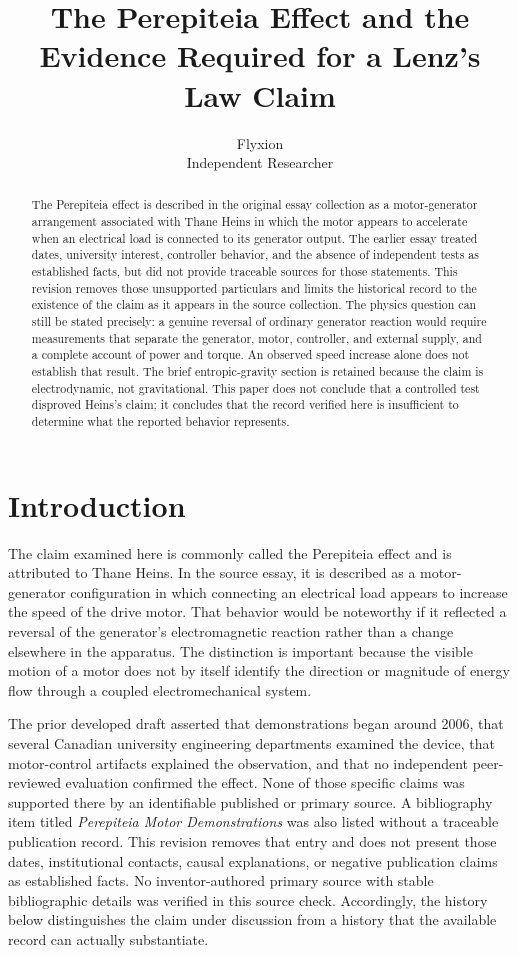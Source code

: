 \documentclass[11pt]{article}
\title{The Perepiteia Effect and the Evidence Required for a Lenz's Law Claim}
\author{Flyxion \\ \small Independent Researcher}
\date{}
\begin{document}
\maketitle

\begin{abstract}
The Perepiteia effect is described in the original essay collection as a motor-generator arrangement associated with Thane Heins in which the motor appears to accelerate when an electrical load is connected to its generator output. The earlier essay treated dates, university interest, controller behavior, and the absence of independent tests as established facts, but did not provide traceable sources for those statements. This revision removes those unsupported particulars and limits the historical record to the existence of the claim as it appears in the source collection. The physics question can still be stated precisely: a genuine reversal of ordinary generator reaction would require measurements that separate the generator, motor, controller, and external supply, and a complete account of power and torque. An observed speed increase alone does not establish that result. The brief entropic-gravity section is retained because the claim is electrodynamic, not gravitational. This paper does not conclude that a controlled test disproved Heins's claim; it concludes that the record verified here is insufficient to determine what the reported behavior represents.
\end{abstract}

\section{Introduction}

The claim examined here is commonly called the Perepiteia effect and is attributed to Thane Heins. In the source essay, it is described as a motor-generator configuration in which connecting an electrical load appears to increase the speed of the drive motor. That behavior would be noteworthy if it reflected a reversal of the generator's electromagnetic reaction rather than a change elsewhere in the apparatus. The distinction is important because the visible motion of a motor does not by itself identify the direction or magnitude of energy flow through a coupled electromechanical system.

The prior developed draft asserted that demonstrations began around 2006, that several Canadian university engineering departments examined the device, that motor-control artifacts explained the observation, and that no independent peer-reviewed evaluation confirmed the effect. None of those specific claims was supported there by an identifiable published or primary source. A bibliography item titled \emph{Perepiteia Motor Demonstrations} was also listed without a traceable publication record. This revision removes that entry and does not present those dates, institutional contacts, causal explanations, or negative publication claims as established facts. No inventor-authored primary source with stable bibliographic details was verified in this source check. Accordingly, the history below distinguishes the claim under discussion from a history that the available record can actually substantiate.
\end{document}
